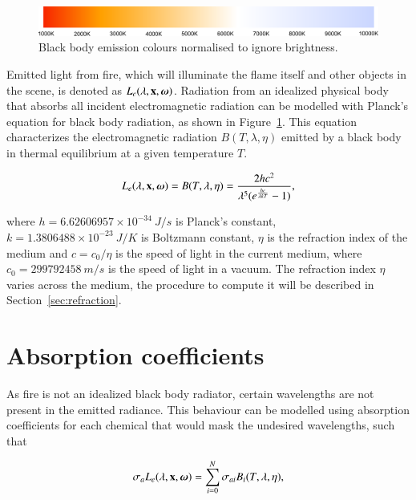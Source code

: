 \begin{figure}[htbp!]
	\centering
	\includegraphics[width=\textwidth]{img/black_body_diag}
	\caption[Cap]{Black body emission colours normalised to ignore brightness\footnotemark.}
	\label{fig:black_body_diag}
\end{figure}

Emitted light from fire, which will illuminate the flame itself and other objects in the scene, is denoted as $L_e(\lambda, \mathbf{x}, \boldsymbol{\omega})$. 
Radiation from an idealized physical body that absorbs all incident electromagnetic radiation can be modelled with Planck's equation for black body radiation, as shown in Figure~\ref{fig:black_body_diag}.
This equation characterizes the electromagnetic radiation $B(T, \lambda, \eta)$ emitted by a black body in thermal equilibrium at a given temperature $T$.

\begin{equation}
L_e(\lambda, \mathbf{x}, \boldsymbol{\omega}) = B(T, \lambda, \eta) = \frac{2 h c^2}{\lambda^5  (e ^\frac{h c}{\lambda k T} - 1)},
\end{equation}

where $h = 6.62606957 \times 10^{-34}~J/s$ is Planck's constant, $k = 1.3806488 \times 10^{-23}~J/K$ is Boltzmann constant, $\eta$ is the refraction index of the medium and $c =  c_0 / \eta$ is the speed of light in the current medium, where $c_0 = 299792458~m/s$ is the speed of light in a vacuum. 
The refraction index $\eta$ varies across the medium, the procedure to compute it will be described in Section~\ref{sec:refraction}.

\section{Absorption coefficients}
\label{sec:absorption_coefficients}

As fire is not an idealized black body radiator, certain wavelengths are not present in the emitted radiance.
This behaviour can be modelled using absorption coefficients for each chemical that would mask the undesired wavelengths, such that

\begin{equation}
\sigma_a L_e(\lambda, \mathbf{x}, \boldsymbol{\omega}) = \sum_{i = 0}^N \sigma_{ai} B_i(T, \lambda, \eta),
\end{equation}

